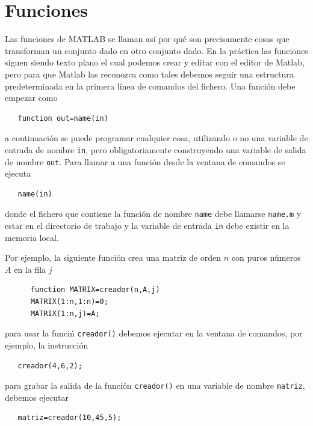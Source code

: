 \documentclass[11pt]{article}
\begin{document}
\section{Funciones}
  Las funciones de MATLAB se llaman as\'i por qu\'e son precisamente cosas que transforman un conjunto dado en otro conjunto dado. En la pr\'actica las funciones siguen siendo texto plano el cual podemos crear y editar con el editor de Matlab, pero para que Matlab las reconozca como tales debemos seguir una estructura predeterminada en la primera l\'inea de comandos del fichero. Una funci\'on debe empezar como
  \begin{verbatim}
   function out=name(in)
  \end{verbatim}
  a continuaci\'on se puede programar cualquier cosa, utilizando o no una variable de entrada de nombre \texttt{in}, pero obligatoriamente construyendo una variable de salida de nombre \texttt{out}. Para llamar a una funci\'on desde la ventana de comandos se ejecuta
  \begin{verbatim}
   name(in)
  \end{verbatim}
  donde el fichero que contiene la funci\'on de nombre \texttt{name} debe llamarse \texttt{name.m} y estar en el directorio de trabajo y la variable de entrada \texttt{in} debe existir en la memoria local.
  
Por ejemplo, la siguiente funci\'on crea una matriz de orden $n$ con puros n\'umeros $A$ en la fila $j$
  \begin{verbatim}
      function MATRIX=creador(n,A,j)
      MATRIX(1:n,1:n)=0;
      MATRIX(1:n,j)=A;
  \end{verbatim}
  para usar la funci\'n \texttt{creador()} debemos ejecutar en la ventana de comandos, por ejemplo, la instrucci\'on
  \begin{verbatim}
   creador(4,6,2);
  \end{verbatim}
  para grabar la salida de la funci\'on \texttt{creador()} en una variable de nombre \texttt{matriz}, debemos ejecutar
  \begin{verbatim}
   matriz=creador(10,45,5);
  \end{verbatim}
\end{document}
